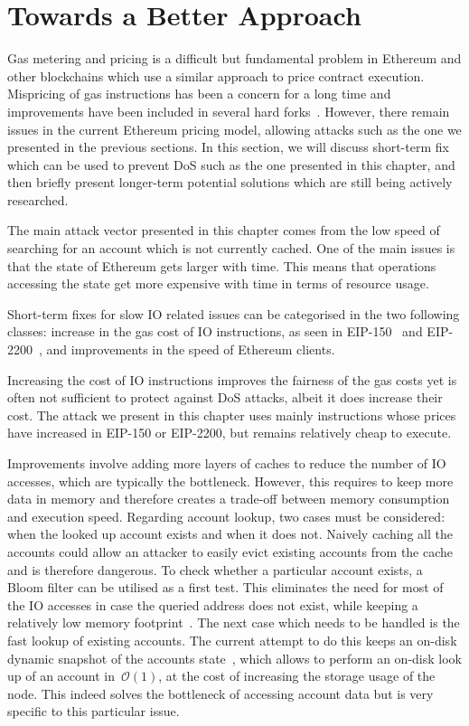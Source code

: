 \section{Towards a Better Approach}
\label{sec:design}

Gas metering and pricing is a difficult but fundamental problem in Ethereum and other blockchains which use a similar approach to price contract execution. Mispricing of gas instructions has been a concern for a long time and improvements have been included in several hard forks~\cite{erc150,eip2200}. However, there remain issues in the current Ethereum pricing model, allowing attacks such as the one we presented in the previous sections. In this section, we will discuss short-term fix which can be used to prevent DoS such as the one presented in this chapter, and then briefly present longer-term potential solutions which are still being actively researched. 

The main attack vector presented in this chapter comes from the low speed of searching for an account which is not currently cached. One of the main issues is that the state of Ethereum gets larger with time. This means that operations accessing the state get more expensive with time in terms of resource usage.

Short-term fixes for slow IO related issues can be categorised in the two following classes: increase in the gas cost of IO instructions, as seen in EIP-150~\cite{erc150} and EIP-2200~\cite{eip2200}, and improvements in the speed of Ethereum clients.

Increasing the cost of IO instructions improves the fairness of the gas costs yet is often not sufficient to protect against DoS attacks, albeit it does increase their cost. The attack we present in this chapter uses mainly instructions whose prices have increased in EIP-150 or EIP-2200, but remains relatively cheap to execute.

Improvements involve adding more layers of caches to reduce the number of IO accesses, which are typically the bottleneck. However, this requires to keep more data in memory and therefore creates a trade-off between memory consumption and execution speed. Regarding account lookup, two cases must be considered: when the looked up account exists and when it does not. Naively caching all the accounts could allow an attacker to easily evict existing accounts from the cache and is therefore dangerous. To check whether a particular account exists, a Bloom filter can be utilised as a first test. This eliminates the need for most of the IO accesses in case the queried address does not exist, while keeping a relatively low memory footprint~\cite{mitzenmacher2002compressed}. The next case which needs to be handled is the fast lookup of existing accounts. The current attempt to do this keeps an on-disk dynamic snapshot of the accounts state~\cite{dynamic-trie-snapshot-pr}, which allows to perform an on-disk look up of an account in~$\mathcal{O}(1)$, at the cost of increasing the storage usage of the node. This indeed solves the bottleneck of accessing account data but is very specific to this particular issue.

